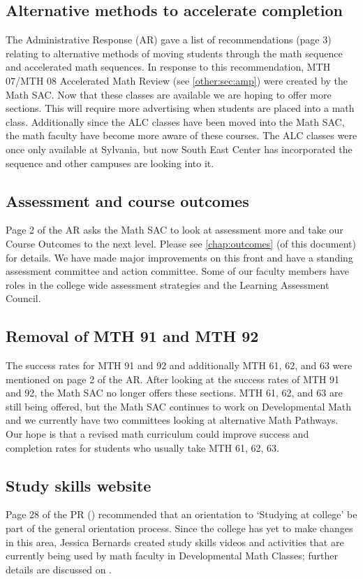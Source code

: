 \subsection{Alternative methods to accelerate completion}
The Administrative Response (AR) gave a list of recommendations (page 3) relating to alternative methods
of moving students through the math sequence and accelerated math sequences.  In
response to this recommendation, MTH 07/MTH 08 Accelerated Math Review (see
\vref{other:sec:amp}) were created by the Math SAC.
Now that these classes are available we are hoping to offer more sections.  This
will require more advertising when students are placed into a math class.
Additionally since the ALC classes have been moved into the Math SAC, the math
faculty have become more aware of these courses.  The ALC classes were once only
available at Sylvania, but now South East Center has incorporated the sequence
and other campuses are looking into it.

\subsection{Assessment and course outcomes}
Page 2 of the AR asks the Math SAC to look at assessment more and take our
Course Outcomes to the next level.  Please see \vref{chap:outcomes} (of this
document) for
details.  We have made major improvements on this front and have a standing
assessment committee and action committee.  Some of our faculty members have
roles in the college wide assessment strategies and the Learning Assessment Council.

\subsection{Removal of MTH 91 and MTH 92}
The success rates for MTH 91 and 92 and additionally MTH 61, 62, and 63 were
mentioned on page 2 of the AR.  After looking at the success rates of MTH 91 and
92, the Math SAC no longer offers these sections.   MTH 61, 62, and 63 are still
being offered, but the Math SAC continues to work on Developmental Math and we
currently have two committees looking at alternative Math Pathways.
Our hope is that a revised math curriculum could improve success and completion
rates for students who usually take MTH 61, 62, 63.

\subsection{Study skills website}
Page 28 of the PR (\cite{mathprogramreview2003}) recommended that an orientation to `Studying at college'
be part of the general orientation process.  Since the college has yet to make
changes in this area, Jessica Bernards created study skills videos and activities
that are currently being used by math faculty in Developmental Math Classes;
further details are discussed on .

